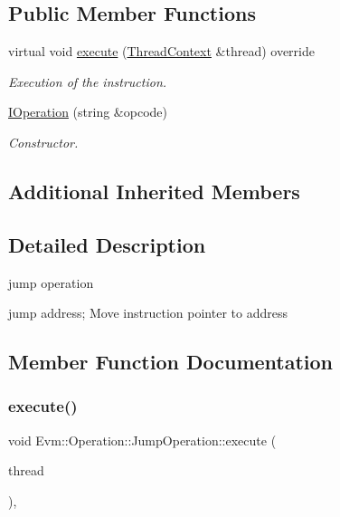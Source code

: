 \subsection*{Public Member Functions}
\begin{DoxyCompactItemize}
\item 
virtual void \mbox{\hyperlink{struct_evm_1_1_operation_1_1_jump_operation_a830ab356fc212ff9ace8b63b0d24dcb1}{execute}} (\mbox{\hyperlink{struct_evm_1_1_thread_context}{Thread\+Context}} \&thread) override
\begin{DoxyCompactList}\small\item\em Execution of the instruction. \end{DoxyCompactList}\item 
\mbox{\hyperlink{struct_evm_1_1_operation_1_1_jump_operation_a65e98ee1b1679e12c1d1dd000ebfe937}{I\+Operation}} (string \&opcode)
\begin{DoxyCompactList}\small\item\em Constructor. \end{DoxyCompactList}\end{DoxyCompactItemize}
\subsection*{Additional Inherited Members}


\subsection{Detailed Description}
jump operation 

jump address; Move instruction pointer to address 

\subsection{Member Function Documentation}
\mbox{\label{struct_evm_1_1_operation_1_1_jump_operation_a830ab356fc212ff9ace8b63b0d24dcb1}} 
\subsubsection{\texorpdfstring{execute()}{execute()}}
{\footnotesize\ttfamily void Evm\+::\+Operation\+::\+Jump\+Operation\+::execute (\begin{DoxyParamCaption}\item[{\mbox{\hyperlink{struct_evm_1_1_thread_context}{Thread\+Context}} \&}]{thread }\end{DoxyParamCaption})\hspace{0.3cm}{\ttfamily [override]}, {\ttfamily [virtual]}}



